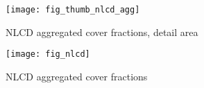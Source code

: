  

\begin{figure}[hpt] 
\begin{center}
  


\texttt{[image: fig\_thumb\_nlcd\_agg]}
\end{center} 
\caption{NLCD aggregated cover fractions, detail area}
\label{fig:thumb_nlcd_agg}
\end{figure} 




\begin{figure}[hpt] 
\begin{center}
  


\texttt{[image: fig\_nlcd]}
\end{center} 
\caption{NLCD aggregated cover fractions}
\label{fig:nlcd}
\end{figure} 

\begin{comment}
\section{Cropland Data Layer (CDL)}
\label{sec:cdl}

\missingfigure{Table or chart showing CDL covereage for various years}

The CDL is only available for a small number of states in 2001.  If
time allows it might be good to compare what is available with our
results as another independent evaluation against a higher-resolution
data set.

\subsection{Reclassification}
\label{sec:cdl-reclass}





\todo{Calculate CDL mask for 5-arcmin cells completely filled}
\todo(Calculate CDL aggregated in GRASS}




\missingfigure{CDL reclassification table}

\subsection{Aggregation}
\label{sec:cdl-aggr}
\end{comment}


